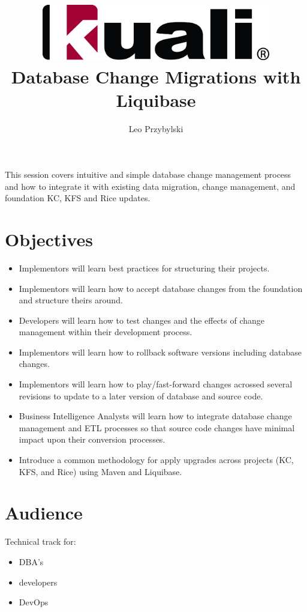 \documentclass[12pt,notitlepage]{article}
\author{Leo Przybylski}
\title{\includegraphics[width=0.75\textwidth]{kuali_base.png}\\Database Change Migrations with Liquibase}
\date{}
\begin{document}
\maketitle


This session covers intuitive and simple database change management
process and how to integrate it with existing data migration, change
management, and foundation KC, KFS and Rice updates.

\section{Objectives}
\begin{itemize}
\item Implementors will learn best practices for structuring their projects.
\item Implementors will learn how to accept database changes from the foundation and structure theirs around.
\item Developers will learn how to test changes and the effects of change management within their development process.
\item Implementors will learn how to rollback software versions including database changes.
\item Implementors will learn how to play/fast-forward changes acrossed several revisions to update to a later version of database and source code.
\item Business Intelligence Analysts will learn how to integrate database change management and ETL processes so that source code changes have minimal impact upon their conversion processes.
\item Introduce a common methodology for apply upgrades across projects (KC,
KFS, and Rice) using Maven and Liquibase.
\end{itemize}

\section{Audience}
Technical track for: 
\begin{itemize}
\item DBA’s
\item developers
\item DevOps
\end{itemize}
\end{document}
